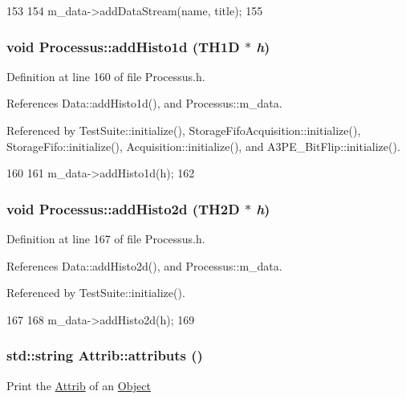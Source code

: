 \begin{DoxyCode}
153                                                        {
154     m_data->addDataStream(name, title);
155   }
\end{DoxyCode}
\hypertarget{classProcessus_ad46e0d4dfdfdcbce001ee6be1746dfa4}{
\subsubsection[{addHisto1d}]{\setlength{\rightskip}{0pt plus 5cm}void Processus::addHisto1d (TH1D $\ast$ {\em h})}}
\label{classProcessus_ad46e0d4dfdfdcbce001ee6be1746dfa4}


Definition at line 160 of file Processus.h.

References Data::addHisto1d(), and Processus::m\_\-data.

Referenced by TestSuite::initialize(), StorageFifoAcquisition::initialize(), StorageFifo::initialize(), Acquisition::initialize(), and A3PE\_\-BitFlip::initialize().


\begin{DoxyCode}
160                            {
161     m_data->addHisto1d(h);
162   }
\end{DoxyCode}
\hypertarget{classProcessus_ac1ed1aed5edaeabdf18aa56775440471}{
\subsubsection[{addHisto2d}]{\setlength{\rightskip}{0pt plus 5cm}void Processus::addHisto2d (TH2D $\ast$ {\em h})}}
\label{classProcessus_ac1ed1aed5edaeabdf18aa56775440471}


Definition at line 167 of file Processus.h.

References Data::addHisto2d(), and Processus::m\_\-data.

Referenced by TestSuite::initialize().


\begin{DoxyCode}
167                            {
168     m_data->addHisto2d(h);
169   }
\end{DoxyCode}
\hypertarget{classAttrib_aee7bbf16b144887f196e1341b24f8a26}{
\subsubsection[{attributs}]{\setlength{\rightskip}{0pt plus 5cm}std::string Attrib::attributs ()}}
\label{classAttrib_aee7bbf16b144887f196e1341b24f8a26}
Print the \hyperlink{classAttrib}{Attrib} of an \hyperlink{classObject}{Object} 

